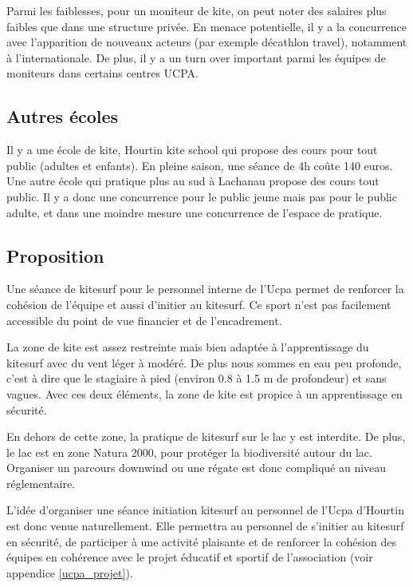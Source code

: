 \documentclass[11pt,a4paper]{report}
\begin{document}
Parmi les faiblesses, pour un moniteur de kite, on peut noter des
salaires plus faibles que dans une structure privée. 
En menace potentielle, il y a  la concurrence avec 
l’apparition de nouveaux acteurs (par exemple décathlon travel),
notamment à l'internationale. De plus, il  y a un turn over
important parmi les équipes  de moniteurs dans certains centres UCPA.

\subsection{Autres écoles}

Il y a une école de kite, Hourtin kite school
qui propose des cours pour tout public (adultes et enfants). 
En pleine saison, une séance de 4h co\^ute 140 euros.
Une autre école qui pratique plus au sud à Lachanau propose
des cours tout public.
Il y a donc une concurrence pour le public jeune mais pas pour le public adulte, et
dans une moindre mesure une concurrence de l'espace de pratique.

\subsection{Proposition}

Une séance de kitesurf pour le personnel interne de l'Ucpa 
permet de renforcer la cohésion de l'équipe et aussi d'initier au kitesurf.
Ce sport n'est pas facilement  accessible du point de vue financier et
de l'encadrement.

La zone de kite est assez restreinte mais bien adaptée à l'apprentissage
du kitesurf avec du vent léger à modéré. De plus nous sommes en 
eau peu profonde, c'est à dire que le stagiaire à pied (environ 0.8 à 1.5 m
de profondeur) et sans vagues. Avec ces deux éléments, la zone de kite 
est propice à un apprentissage en sécurité.

En dehors de cette zone, la pratique de kitesurf sur le lac
y est interdite. De plus, le lac est en zone Natura 2000\cite{natura2000}, pour
protéger la biodiversité autour du lac.
Organiser un parcours downwind ou une régate est donc compliqué
au niveau réglementaire.

L'idée d'organiser une séance initiation kitesurf
au personnel de l'Ucpa d'Hourtin est donc venue naturellement.
Elle permettra au personnel de s'initier au kitesurf en 
sécurité, de participer à une activité plaisante
et de renforcer la cohésion des équipes en cohérence avec le 
projet éducatif et sportif de l'association (voir appendice \ref{ucpa_projet}).
\end{document}
